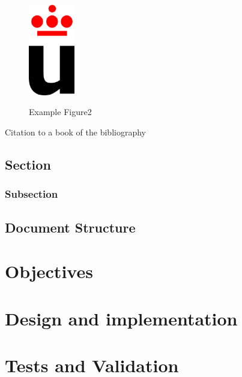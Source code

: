 \documentclass[a4paper, 12pt]{book}
\begin{document}
\begin{figure}[h!]
  \centering
  \includegraphics[width=2cm, keepaspectratio]{img/logo_vect.eps}
  \label{fig:logo2}
  \caption{Example Figure2}
\end{figure}

Citation to a book of the bibliography~\cite{LutzPPy}

\section{Section}
\label{sec:section}

\subsection{Subsection}
\label{subsec:subsection}

\section{Document Structure}
\label{sec:structure}




\chapter{Objectives}
\label{chap:objectives}



\chapter{Design and implementation}
\label{chap:design}



\chapter{Tests and Validation}
\label{chap:tests}


\end{document}
